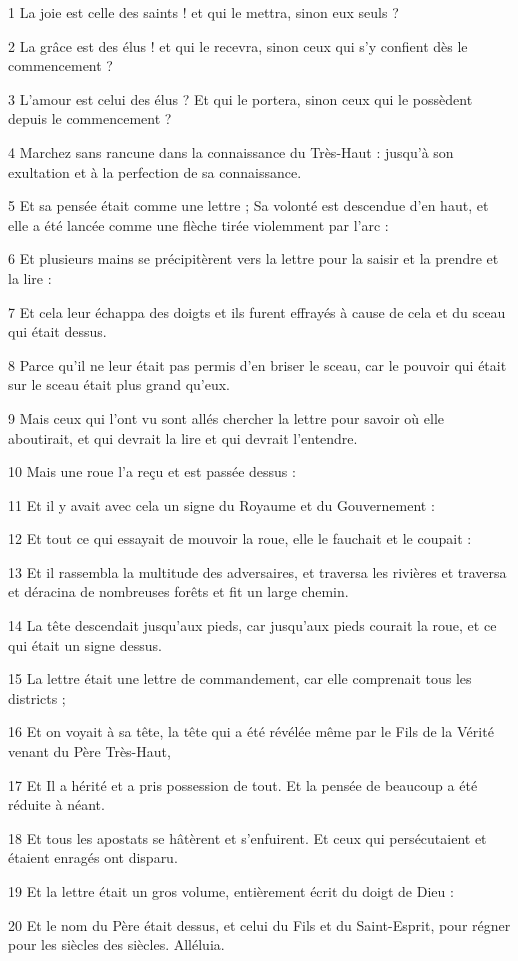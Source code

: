 \par 1 La joie est celle des saints ! et qui le mettra, sinon eux seuls ?
\par 2 La grâce est des élus ! et qui le recevra, sinon ceux qui s’y confient dès le commencement ?
\par 3 L'amour est celui des élus ? Et qui le portera, sinon ceux qui le possèdent depuis le commencement ?
\par 4 Marchez sans rancune dans la connaissance du Très-Haut : jusqu'à son exultation et à la perfection de sa connaissance.
\par 5 Et sa pensée était comme une lettre ; Sa volonté est descendue d'en haut, et elle a été lancée comme une flèche tirée violemment par l'arc :
\par 6 Et plusieurs mains se précipitèrent vers la lettre pour la saisir et la prendre et la lire :
\par 7 Et cela leur échappa des doigts et ils furent effrayés à cause de cela et du sceau qui était dessus.
\par 8 Parce qu'il ne leur était pas permis d'en briser le sceau, car le pouvoir qui était sur le sceau était plus grand qu'eux.
\par 9 Mais ceux qui l'ont vu sont allés chercher la lettre pour savoir où elle aboutirait, et qui devrait la lire et qui devrait l'entendre.
\par 10 Mais une roue l'a reçu et est passée dessus :
\par 11 Et il y avait avec cela un signe du Royaume et du Gouvernement :
\par 12 Et tout ce qui essayait de mouvoir la roue, elle le fauchait et le coupait :
\par 13 Et il rassembla la multitude des adversaires, et traversa les rivières et traversa et déracina de nombreuses forêts et fit un large chemin.
\par 14 La tête descendait jusqu'aux pieds, car jusqu'aux pieds courait la roue, et ce qui était un signe dessus.
\par 15 La lettre était une lettre de commandement, car elle comprenait tous les districts ;
\par 16 Et on voyait à sa tête, la tête qui a été révélée même par le Fils de la Vérité venant du Père Très-Haut,
\par 17 Et Il a hérité et a pris possession de tout. Et la pensée de beaucoup a été réduite à néant.
\par 18 Et tous les apostats se hâtèrent et s'enfuirent. Et ceux qui persécutaient et étaient enragés ont disparu.
\par 19 Et la lettre était un gros volume, entièrement écrit du doigt de Dieu :
\par 20 Et le nom du Père était dessus, et celui du Fils et du Saint-Esprit, pour régner pour les siècles des siècles. Alléluia.

